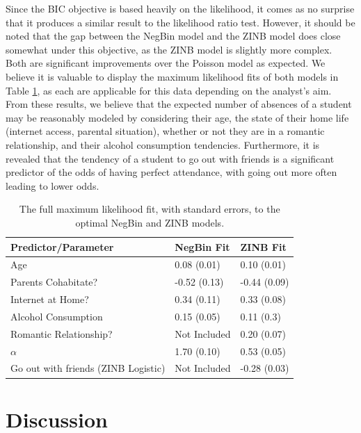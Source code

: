 \documentclass[12pt, titlepage]{article}
\begin{document}
	Since the BIC objective is based heavily on the likelihood, it comes as no surprise that it produces a similar result to the likelihood ratio test. However, it should be noted that the gap between the NegBin model and the ZINB model does close somewhat under this objective, as the ZINB model is slightly more complex. Both are significant improvements over the Poisson model as expected. We believe it is valuable to display the maximum likelihood fits of both models in Table \ref{MLE}, as each are applicable for this data depending on the analyst's aim. From these results, we believe that the expected number of absences of a student may be reasonably modeled by considering their age, the state of their home life (internet access, parental situation), whether or not they are in a romantic relationship, and their alcohol consumption tendencies. Furthermore, it is revealed that the tendency of a student to go out with friends is a significant predictor of the odds of having perfect attendance, with going out more often leading to lower odds.
	\begin{table}[h!]
		\centering
		\begin{tabular}{|l|l|l|}
			\hline
			Predictor/Parameter & NegBin Fit & ZINB Fit \\
			\hline 
			Age & 0.08 (0.01) & 0.10 (0.01)\\
			Parents Cohabitate? & -0.52 (0.13) & -0.44 (0.09) \\
			Internet at Home? & 0.34 (0.11) & 0.33 (0.08) \\
			Alcohol Consumption& 0.15 (0.05) & 0.11 (0.3) \\
			Romantic Relationship?& Not Included & 0.20 (0.07) \\
			$\alpha$ & 1.70 (0.10) & 0.53 (0.05) \\
			Go out with friends (ZINB Logistic) & Not Included & -0.28 (0.03) \\
			\hline
		\end{tabular}
		\caption{The full maximum likelihood fit, with standard errors, to the optimal NegBin and ZINB models.}
		\label{MLE}
	\end{table}
	\section{Discussion}
	
\end{document}
